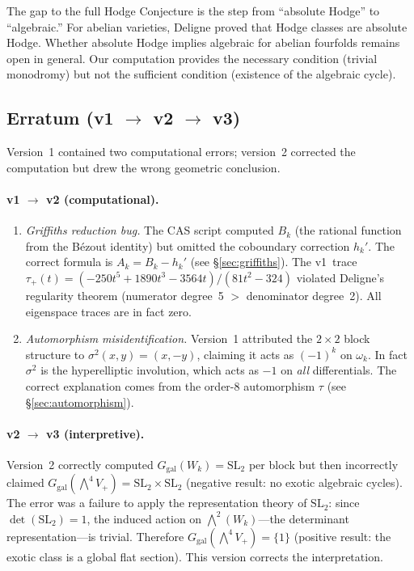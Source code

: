 \documentclass[11pt]{article}
\theoremstyle{plain}
\theoremstyle{definition}
\theoremstyle{remark}
\newcommand{\SL}{\mathrm{SL}}
\newcommand{\Ggal}{G_{\mathrm{gal}}}
\begin{document}
The gap to the full Hodge Conjecture is the step from ``absolute Hodge''
to ``algebraic.'' For abelian varieties, Deligne proved that Hodge
classes are absolute Hodge. Whether absolute Hodge implies algebraic for
abelian fourfolds remains open in general. Our computation provides the
necessary condition (trivial monodromy) but not the sufficient condition
(existence of the algebraic cycle).

\subsection{Erratum (v1 $\to$ v2 $\to$ v3)}

Version~1 contained two computational errors; version~2 corrected the
computation but drew the wrong geometric conclusion.

\paragraph{v1 $\to$ v2 (computational).}
\begin{enumerate}[nosep]
\item \emph{Griffiths reduction bug.} The CAS script computed $B_k$ (the
  rational function from the B\'ezout identity) but omitted the
  coboundary correction $h_k'$. The correct formula is $A_k = B_k - h_k'$
  (see \S\ref{sec:griffiths}). The v1~trace $\tau_+(t) =
  (-250t^5 + 1890t^3 - 3564t) / (81t^2 - 324)$ violated Deligne's
  regularity theorem (numerator degree~5 $>$ denominator degree~2).
  All eigenspace traces are in fact zero.
\item \emph{Automorphism misidentification.} Version~1 attributed the
  $2 \times 2$ block structure to $\sigma^2(x,y) = (x,-y)$, claiming
  it acts as $(-1)^k$ on $\omega_k$. In fact $\sigma^2$ is the
  hyperelliptic involution, which acts as $-1$ on \emph{all}
  differentials. The correct explanation comes from the order-8
  automorphism $\tau$ (see \S\ref{sec:automorphism}).
\end{enumerate}

\paragraph{v2 $\to$ v3 (interpretive).}
Version~2 correctly computed $\Ggal(W_k) = \SL_2$ per block but
then incorrectly claimed $\Ggal(\bigwedge^4 V_+) = \SL_2 \times \SL_2$
(negative result: no exotic algebraic cycles). The error was a
failure to apply the representation theory of $\SL_2$: since
$\det(\SL_2) = 1$, the induced action on $\bigwedge^2(W_k)$---the
determinant representation---is trivial. Therefore
$\Ggal(\bigwedge^4 V_+) = \{1\}$ (positive result: the exotic class
is a global flat section). This version corrects the interpretation.
\end{document}

